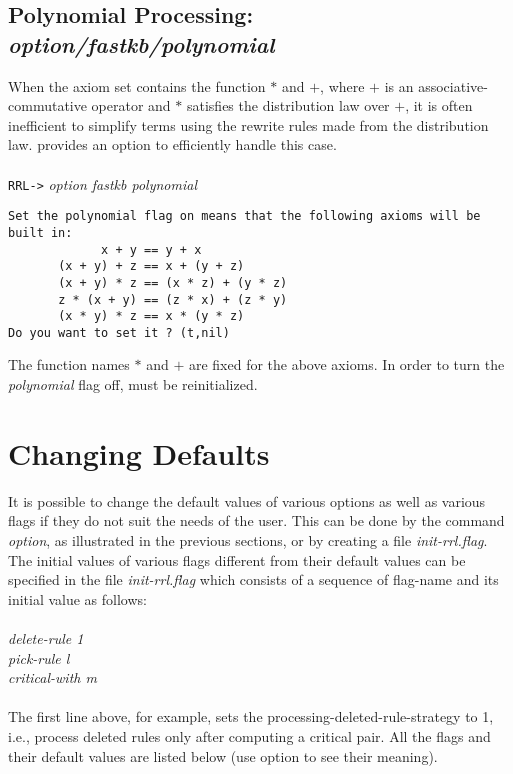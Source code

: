 \subsection{Polynomial Processing: \em option/fastkb/polynomial}

When the axiom set contains the function $*$ and $+$,
where $+$ is an associative-commutative operator and $*$ satisfies
the distribution law over $+$, it is often inefficient to
simplify terms using the rewrite rules made from the distribution law.
\RRL provides an option to efficiently handle this case.\\
\\
{\tt RRL->} {\em option fastkb polynomial}
\begin{verbatim}
Set the polynomial flag on means that the following axioms will be built in:
             x + y == y + x
       (x + y) + z == x + (y + z)
       (x + y) * z == (x * z) + (y * z)
       z * (x + y) == (z * x) + (z * y)
       (x * y) * z == x * (y * z)
Do you want to set it ? (t,nil) 
\end{verbatim}

The function names $*$ and $+$ are fixed for the above axioms.
In order to turn the {\em polynomial} flag off, 
\RRL must be reinitialized. 

\section{Changing Defaults}

It is possible to change the default values of various options as well
as various flags if they do not suit the needs of the user.  This can
be done by the command {\em option}, as illustrated in the 
previous sections, or 
by creating a file {\em init-rrl.flag}. The initial values of
various flags different from their default values can be specified in
the file  {\em init-rrl.flag} 
which consists of a sequence of flag-name and its initial
value as follows:\\ \\ {\em delete-rule 1\\ pick-rule l\\
critical-with m\\}\\ The first line above, for example, sets the
processing-deleted-rule-strategy to 1, i.e., process deleted rules
only after computing a critical pair.  All the flags
and their default values are listed below
(use option to see their meaning).

